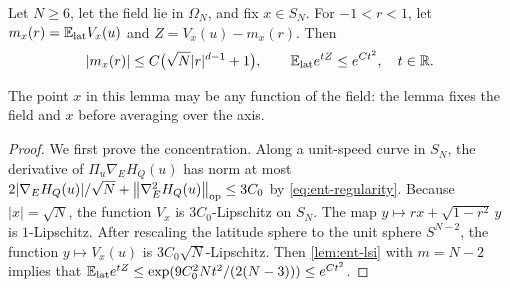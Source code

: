\begin{lemma}\label{lem:ent-latitude}
Let $N\ge6$, let the field lie in $\Omega_N$, and fix $x\in S_N$. For
$-1<r<1$, let $m_x(r)=\mathbb E_{\rm lat}V_x(u)$ and $Z=V_x(u)-m_x(r)$. Then
\begin{equation}\label{eq:ent-latitude}
 |m_x(r)|\le C\bigl(\sqrt N|r|^{d-1}+1\bigr),\qquad
 \mathbb E_{\rm lat}e^{tZ}\le e^{Ct^2},\quad t\in\mathbb R .
\end{equation}
\end{lemma}

The point $x$ in this lemma may be any function of the field: the lemma
fixes the field and $x$ before averaging over the axis.

\begin{proof}
We first prove the concentration. Along a unit-speed curve in $S_N$, the
derivative of $\Pi_u\nabla_EH_Q(u)$ has norm at most $2|\nabla_EH_Q(u)|/\sqrt N+\left\lVert\nabla^2_EH_Q(u)\right\rVert_{\rm op}
\le3C_0$ by \eqref{eq:ent-regularity}. Because $|x|=\sqrt N$, the function
$V_x$ is $3C_0$-Lipschitz on $S_N$. The map $y\mapsto rx+\sqrt{1-r^2}\,y$ is
$1$-Lipschitz. After rescaling the latitude sphere to the unit sphere
$S^{N-2}$, the function $y\mapsto V_x(u)$ is $3C_0\sqrt
N$-Lipschitz. Then \cref{lem:ent-lsi} with $m=N-2$ implies that
$\mathbb E_{\rm lat}e^{tZ}\le\exp(9C_0^2Nt^2/(2(N-3)))\le e^{Ct^2}$.


\end{proof}
